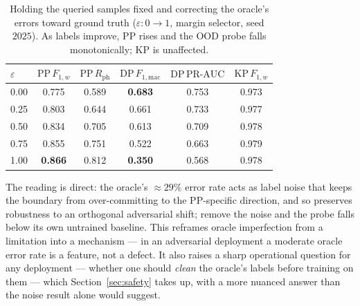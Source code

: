 \begin{table}[H]
\centering
\caption{Holding the queried samples fixed and correcting the oracle's errors
toward ground truth ($\varepsilon\!:\!0\to1$, margin selector, seed $2025$). As
labels improve, PP rises and the OOD probe falls monotonically; KP is unaffected.}
\label{tab:cursor}
\small
\begin{tabular}{@{}lccccc@{}}
\toprule
$\varepsilon$ & $\mathrm{PP}\,F_{1,w}$ & $\mathrm{PP}\,R_{\text{ph}}$ & $\mathrm{DP}\,F_{1,\mathrm{mac}}$ & $\mathrm{DP}\,\text{PR-AUC}$ & $\mathrm{KP}\,F_{1,w}$ \\
\midrule
0.00 & 0.775 & 0.589 & \textbf{0.683} & 0.753 & 0.973 \\
0.25 & 0.803 & 0.644 & 0.661 & 0.733 & 0.977 \\
0.50 & 0.834 & 0.705 & 0.613 & 0.709 & 0.978 \\
0.75 & 0.855 & 0.751 & 0.522 & 0.663 & 0.979 \\
1.00 & \textbf{0.866} & 0.812 & \textbf{0.350} & 0.568 & 0.978 \\
\bottomrule
\end{tabular}
\end{table}

The reading is direct: the oracle's $\approx\!29\%$ error rate acts as label
noise that keeps the boundary from over-committing to the PP-specific direction,
and so preserves robustness to an orthogonal adversarial shift; remove the noise
and the probe falls below its own untrained baseline. This reframes oracle
imperfection from a limitation into a mechanism --- in an adversarial deployment a
moderate oracle error rate is a feature, not a defect. It also raises a sharp
operational question for any deployment --- whether one should \emph{clean} the
oracle's labels before training on them --- which Section~\ref{sec:safety} takes
up, with a more nuanced answer than the noise result alone would suggest.
